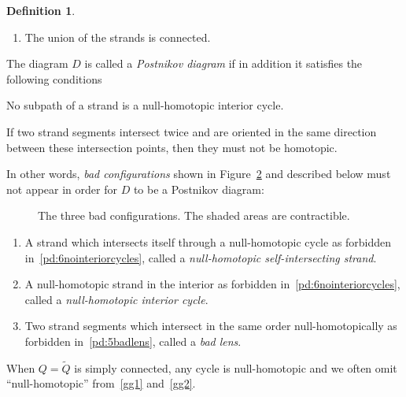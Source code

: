\documentclass{article}
\theoremstyle{definition}
\newtheorem{defn}[thm]{Definition}
\begin{document}
\begin{defn}
\begin{enumerate}
{	\def\svgwidth{150pt}
		\begin{figure}			\centering
			
			\caption{One oriented (left) and two alternating (right) regions. The bold segment is boundary.}
			\label{fig:oriented-alternating}
		\end{figure}}
	\item\label{pd:5} The union of the strands is connected.
    \end{enumerate}
    The diagram $D$ is called a \textit{Postnikov diagram} if in addition it satisfies the following conditions
    \begin{enumerate}
        {\item No subpath of a strand is a null-homotopic interior cycle.\label{pd:6nointeriorcycles}}
	{\item\label{spd:2} If two strand segments intersect twice and are oriented in the same direction between these intersection points, then they must not be homotopic.\label{pd:5badlens}} 
    \end{enumerate}
	In other words, \textit{bad configurations} shown in Figure~\ref{fig:bad-configurations} and described below must not appear in order for $D$ to be a Postnikov diagram:
	\def\svgwidth{150pt}
	\begin{figure}		\centering
		
		\caption{The three bad configurations. The shaded areas are contractible.}
		\label{fig:bad-configurations}
	\end{figure}
	\begin{enumerate}
		\item\label{gg1} A strand which intersects itself through a null-homotopic cycle as forbidden in~\eqref{pd:6nointeriorcycles}, called a \textit{null-homotopic self-intersecting strand}. 
		\item\label{gg2} A null-homotopic strand in the interior as forbidden in~\eqref{pd:6nointeriorcycles}, called a \textit{null-homotopic interior cycle}. 
		\item\label{gg3} Two strand segments which intersect in the same order null-homotopically as forbidden in~\eqref{pd:5badlens}, called a \textit{bad lens}.
	\end{enumerate}
	When $Q=\widetilde Q$ is simply connected, any cycle is null-homotopic and we often omit ``null-homotopic'' from~\eqref{gg1} and~\eqref{gg2}.
\end{defn}
\end{document}
